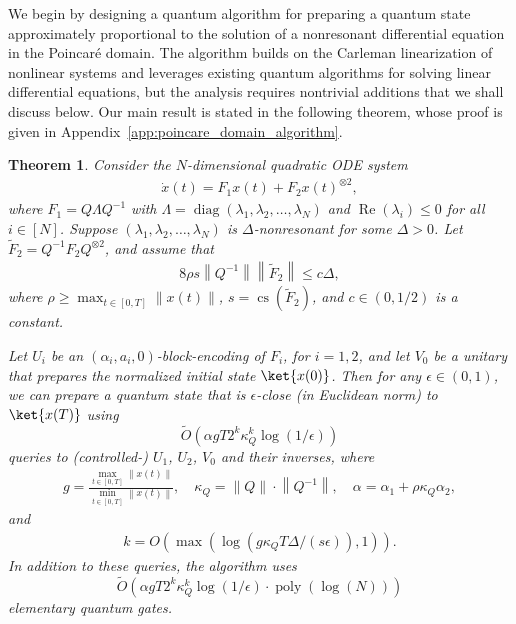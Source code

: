 \documentclass[superscriptaddress,onecolumn,nofootinbib,longbibliography,a4paper,accepted=2026-09-29]{quantumarticle}
\theoremstyle{plain}
\newtheorem{thm}{Theorem}
\theoremstyle{definition}
\numberwithin{thm}{section}
\numberwithin{assumption}{section}
\numberwithin{lemma}{section}
\numberwithin{prop}{section}
\numberwithin{cor}{section}
\numberwithin{definition}{section}
\numberwithin{rmk}{section}
\numberwithin{equation}{section}
\newcommand{\norm}[1]     {\left\| #1 \right\|}
\newcommand{\ot}{\otimes}
\newcommand{\lrb}[1]{\left ( #1 \right )}
\newcommand{\realpart}[1]{\operatorname{Re}\lrb{#1}}
\newcommand{\mypoly}[1]{\operatorname{poly} \lrb{#1}}
\newcommand{\mylog}[1]{\operatorname{log} \lrb{#1}}
\newcommand{\myO}[1]{O\lrb{#1}}
\newcommand{\mytO}[1]{\tilde{O}\lrb{#1}}
\newcommand{\diag}[1]{\operatorname{diag}\lrb{#1}}
\begin{document}
We begin by designing a quantum algorithm for preparing a quantum state approximately proportional to the solution of a nonresonant differential equation in the Poincar\'{e} domain. The algorithm builds on the Carleman linearization of nonlinear systems and leverages existing quantum algorithms for solving linear differential equations, but the analysis requires nontrivial additions that we shall discuss below. Our main result is stated in the following theorem, whose proof is given in Appendix~\ref{app:poincare_domain_algorithm}.
\begin{thm}
\label{thm:Poincarealgorithm}
Consider the $N$-dimensional quadratic ODE system
\begin{align}
\label{eq:Poincaresystem}
    \dot{x}(t) = F_1 x(t) + F_2 x(t)^{\ot 2},
\end{align}
where $F_1=Q\Lambda Q^{-1}$ with $\Lambda=\diag{\lambda_1, \lambda_2, \dots, \lambda_N}$ and $\realpart{\lambda_i} \le 0$ for all $i \in [N]$. Suppose $(\lambda_1, \lambda_2, \dots, \lambda_N)$ is $\Delta$-nonresonant for some $\Delta>0$. Let $\tilde{F}_2=Q^{-1}F_2Q^{\otimes 2}$, and assume that 
\begin{align}
8\rho s \norm{Q^{-1}} \norm{\tilde{F}_2} \le c\Delta,   \end{align}
where $\rho \ge \max_{t \in [0, T]} \norm{x(t)}$, $s=\operatorname{cs}(\tilde{F}_2)$, and $c \in (0,1/2)$ is a constant. 

Let $U_i$ be an $(\alpha_i, a_i, 0)$-block-encoding of $F_i$, for $i=1,2$, and let $V_0$ be a unitary that prepares the normalized initial state $\ket{x(0)}$. Then for any $\epsilon \in (0, 1)$, we can prepare a quantum state that is $\epsilon$-close (in Euclidean norm) to $\ket{x(T)}$ using 
$$\mytO{\alpha g T  2^k \kappa_Q^k \mylog{1/\epsilon}}$$
queries to (controlled-) $U_1$, $U_2$, $V_0$ and their inverses, where 
\begin{align}
g=\frac{\max_{t \in [0, T]} {\norm{x(t)}}}{\min_{t \in [0, T]} {\norm{x(t)}}}, \quad
\kappa_Q=\norm{Q}\cdot \norm{Q^{-1}}, \quad
\alpha=\alpha_1+{\rho\kappa_Q\alpha_2}, 
\end{align} 
and
\begin{align}
k=\myO{\max(\mylog{ g  \kappa_Q T\Delta/(s\epsilon)}, 1)}.    
\end{align}
In addition to these queries, the algorithm uses
$$\mytO{\alpha g T 2^k \kappa_Q^k \mylog{1/\epsilon}\cdot \mypoly{\mylog{N}}}$$
elementary quantum gates.
\label{thm:algorithm_complexity_poincare_domain_case}
\end{thm}
\end{document}
